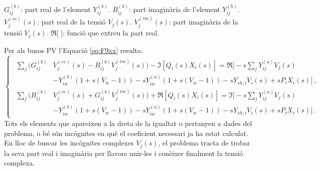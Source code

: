 $G^{(b)}_{ij}$: part real de l'element $Y^{(b)}_{ij}$.
\vs
$B^{(b)}_{ij}$: part imaginària de l'element $Y^{(b)}_{ij}$.
\vs
$V^{(re)}_j(s)$: part real de la tensió $V_j(s)$.
\vs
$V^{(im)}_j(s)$: part imaginària de la tensió $V_j(s)$.
\vs
$\Re$[ ]: funció que extreu la part real.

Per als busos PV l'Equació \ref{eq:F9xx} resulta:
\begin{equation}
    \begin{cases}
    \begin{split}
    \sum_{j}(G^{(b)}_{ij}&V^{(re)}_j(s)-B^{(b)}_{ij}V^{(im)}_j(s))-\Im[Q_i(s)X_i(s)] = \Re\biggl[-s\sum_{j}Y^{(a)}_{ij}V_j(s)\\
    &-Y^{(b)}_{iw}(1+s(V_w-1))-sY^{(a)}_{iw}(1+s(V_w-1))-sY_{sh,i}V_i(s)+sP_iX_i(s)\biggr]\ ,\\
    \sum_{j}(B^{(b)}_{ij}&V^{(re)}_j(s)+G^{(b)}_{ij}V^{(im)}_j(s))+\Re[Q_i(s)X_i(s)] = \Im\biggl[-s\sum_{j}Y^{(a)}_{ij}V_j(s)\\
     &-Y^{(b)}_{iw}(1+s(V_w-1))-sY^{(a)}_{iw}(1+s(V_w-1))-sY_{sh,i}V_i(s)+sP_iX_i(s)\biggr]\ .
    \end{split}
\end{cases}
        \label{eq:F9PV1}
\end{equation}
Tots els elements que apareixen a la dreta de la igualtat o pertanyen a dades del problema, o bé són incògnites en què el coeficient necessari ja ha estat calculat. En lloc de buscar les incògnites complexes $V_j(s)$, el problema tracta de trobar la seva part real i imaginària per llavors unir-les i conèixer finalment la tensió complexa.

